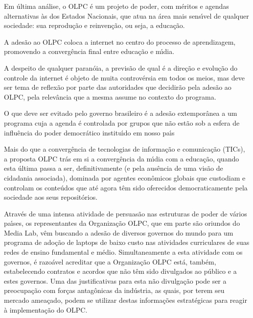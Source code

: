 \documentclass[
12pt,		%
openright,	%
twoside,  %
a4paper,			%
chapter=TITLE,		%
english,			%
french,				%
spanish,			%
brazil				%
]{USPSC-classe/USPSC}
\begin{document}
\begin{alineas}
\item \textquotedbl Em \'ultima an\'alise, o OLPC \'e um projeto de poder, com m\'eritos e agendas alternativas \`as dos Estados Nacionais, que atua na \'area mais sens\'{\i}vel de qualquer sociedade: sua reprodu\c{c}\~ao e reinven\c{c}\~ao, ou seja, a educa\c{c}\~ao.\textquotedbl 
\item \textquotedbl A ades\~ao ao OLPC coloca a internet no centro do processo de aprendizagem, promovendo a converg\^encia final entre educa\c{c}\~ao e m\'{\i}dia.\textquotedbl 
\item \textquotedbl A despeito de qualquer paran\'oia, a previs\~ao de qual \'e a dire\c{c}\~ao e evolu\c{c}\~ao do controle da internet \'e objeto de muita controv\'ersia em todos os meios, mas deve ser tema de reflex\~ao por parte das autoridades que decidir\~ao pela ades\~ao ao OLPC, pela relev\^ancia que a mesma assume no contexto do programa.\textquotedbl 
\item \textquotedbl O que deve ser evitado pelo governo brasileiro \'e a ades\~ao extempor\^anea a um programa cuja a agenda \'e controlada por grupos que n\~ao est\~ao sob a esfera de influ\^encia do poder democr\'atico institu\'{\i}do em nosso pa\'{\i}s\textquotedbl 
\item \textquotedbl Mais do que a converg\^encia de tecnologias de informa\c{c}\~ao e comunica\c{c}\~ao (TICs), a proposta OLPC tr\'as em si a converg\^encia da m\'{\i}dia com a educa\c{c}\~ao, quando esta \'ultima passa a ser, definitivamente (e pela aus\^encia de uma vis\~ao de cidadania associada), dominada por agentes econ\^omicos globais que custodiam e controlam os conte\'udos que at\'e agora t\^em sido oferecidos democraticamente pela sociedade aos seus reposit\'orios.\textquotedbl 
\item \textquotedbl Atrav\'es de uma intensa atividade de persuas\~ao nas estruturas de poder de v\'arios pa\'{\i}ses, os representantes da Organiza\c{c}\~ao OLPC, que em parte s\~ao oriundos do Media Lab, v\^em buscando a ades\~ao de diversos governos do mundo para um programa de ado\c{c}\~ao de laptops de baixo custo nas atividades curriculares de suas redes de ensino fundamental e m\'edio. Simultaneamente a esta atividade com os governos, \'e razo\'avel acreditar que a Organiza\c{c}\~ao OLPC est\'a, tamb\'em, estabelecendo contratos e acordos que n\~ao t\^em sido divulgados ao p\'ublico e a estes governos. Uma das justificativas para esta n\~ao divulga\c{c}\~ao pode ser a preocupa\c{c}\~ao com for\c{c}as antag\^onicas da ind\'ustria, as quais, por terem seu mercado amea\c{c}ado, podem se utilizar destas informa\c{c}\~oes estrat\'egicas para reagir \`a implementa\c{c}\~ao do OLPC.\textquotedbl 

\end{alineas}
\end{document}
